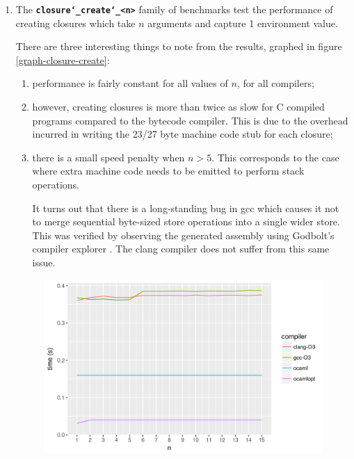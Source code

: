 \documentclass[12pt,a4paper,twoside,openright]{report}
\begin{document}
\begin{enumerate}
  \item
    The \textbf{\texttt{closure\char`_create\char`_<n>}} family of benchmarks test the performance of
    creating closures which take $n$ arguments and capture 1 environment value.

    There are three interesting things to note from the results, graphed in figure \ref{graph-closure-create}:
    \begin{enumerate}
      \item performance is fairly constant for all values of $n$, for all compilers;
      \item however, creating closures is more than twice as slow for C
        compiled programs compared to the bytecode compiler. This is
        due to the overhead incurred in writing the 23/27 byte machine code stub
        for each closure;

      \item there is a small speed penalty when $n>5$. This
        corresponds to the case where extra machine code needs to be emitted to
        perform stack operations.

        It turns out that there is a long-standing
        bug in gcc which causes it not to merge sequential byte-sized store
        operations into a single wider store. This was verified by observing
        the generated assembly using Godbolt's compiler explorer
        \cite{godbolt}. The clang compiler does not suffer from this same
        issue.
    \end{enumerate}

    \begin{figure}[h]
\centering
  \includegraphics[width=16cm]{resultclosure_create_summary_all-b477d4580}


\end{figure}
\end{enumerate}
\end{document}

